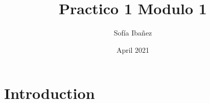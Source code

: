\documentclass{article}
\title{Practico 1 Modulo 1}
\author{Sofía Ibañez}
\date{April 2021}
\begin{document}
\maketitle

\section{Introduction}

\subsection{}
\end{document}
